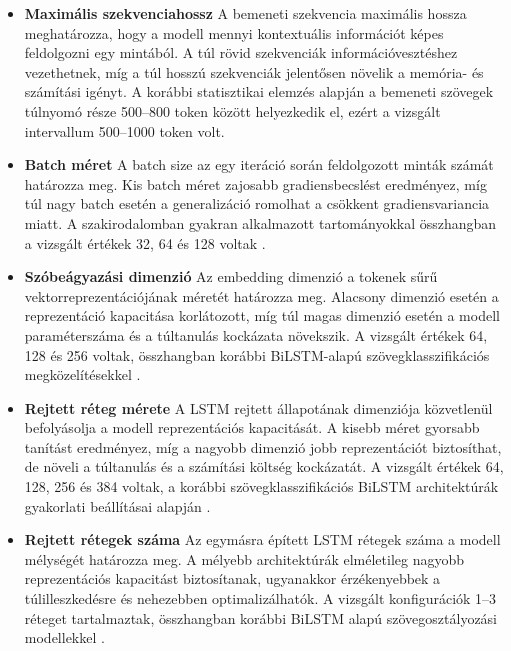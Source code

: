\begin{itemize}

\item \textbf{Maximális szekvenciahossz}  
A bemeneti szekvencia maximális hossza meghatározza, hogy a modell mennyi kontextuális információt képes feldolgozni egy mintából. A túl rövid szekvenciák információvesztéshez vezethetnek, míg a túl hosszú szekvenciák jelentősen növelik a memória- és számítási igényt. A korábbi statisztikai elemzés alapján a bemeneti szövegek túlnyomó része 500–800 token között helyezkedik el, ezért a vizsgált intervallum 500–1000 token volt.

\item \textbf{Batch méret}  
A batch size az egy iteráció során feldolgozott minták számát határozza meg. Kis batch méret zajosabb gradiensbecslést eredményez, míg túl nagy batch esetén a generalizáció romolhat a csökkent gradiensvariancia miatt. A szakirodalomban gyakran alkalmazott tartományokkal összhangban a vizsgált értékek 32, 64 és 128 voltak \cite{mlltclassificationbilstm}.

\item \textbf{Szóbeágyazási dimenzió}  
Az embedding dimenzió a tokenek sűrű vektorreprezentációjának méretét határozza meg. Alacsony dimenzió esetén a reprezentáció kapacitása korlátozott, míg túl magas dimenzió esetén a modell paraméterszáma és a túltanulás kockázata növekszik. A vizsgált értékek 64, 128 és 256 voltak, összhangban korábbi BiLSTM-alapú szövegklasszifikációs megközelítésekkel \cite{mlltclassificationbilstm, qin2023bilstm_attention}.

\item \textbf{Rejtett réteg mérete}  
A LSTM rejtett állapotának dimenziója közvetlenül befolyásolja a modell reprezentációs kapacitását. A kisebb méret gyorsabb tanítást eredményez, míg a nagyobb dimenzió jobb reprezentációt biztosíthat, de növeli a túltanulás és a számítási költség kockázatát. A vizsgált értékek 64, 128, 256 és 384 voltak, a korábbi szövegklasszifikációs BiLSTM architektúrák gyakorlati beállításai alapján \cite{qin2023bilstm_attention}.

\item \textbf{Rejtett rétegek száma}  
Az egymásra épített LSTM rétegek száma a modell mélységét határozza meg. A mélyebb architektúrák elméletileg nagyobb reprezentációs kapacitást biztosítanak, ugyanakkor érzékenyebbek a túlilleszkedésre és nehezebben optimalizálhatók. A vizsgált konfigurációk 1–3 réteget tartalmaztak, összhangban korábbi BiLSTM alapú szövegosztályozási modellekkel \cite{mlltclassificationbilstm, qin2023bilstm_attention}.


\end{itemize}
